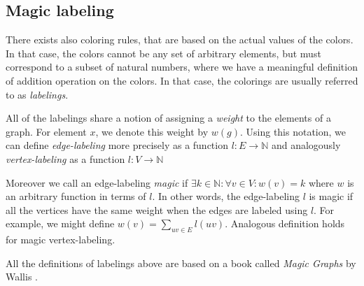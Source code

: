 \subsection{Magic labeling}

There exists also coloring rules, that are based on the actual values of the colors. In that case, the colors cannot be any set of arbitrary elements, but must correspond to a subset of natural numbers, where we have a meaningful definition of addition operation on the colors. In that case, the colorings are usually referred to as \textit{labelings}.

All of the labelings share a notion of assigning a \textit{weight} to the elements of a graph. For element $x$, we denote this weight by $w(g)$. Using this notation, we can define \textit{edge-labeling} more precisely as a function $l:E \rightarrow \mathbb{N}$ and analogously \textit{vertex-labeling} as a function $l:V \rightarrow \mathbb{N}$

Moreover we call an edge-labeling \textit{magic} if $\exists k \in \mathbb{N} : \forall v \in V:w(v) = k$ where $w$ is an arbitrary function in terms of $l$. In other words, the edge-labeling $l$ is magic if all the vertices have the same weight when the edges are labeled using $l$. For example, we might define $w(v) = \sum_{uv \in E}l(uv)$. Analogous definition holds for magic vertex-labeling.

All the definitions of labelings above are based on a book called \textit{Magic Graphs} by Wallis \cite{marrwall2013}.